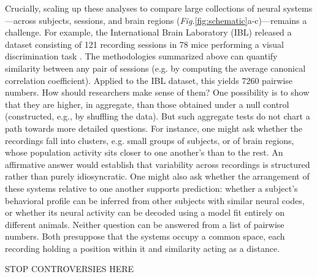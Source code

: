 Crucially, scaling up these analyses to compare large collections of neural systems---across subjects, sessions, and brain regions (\textit{Fig.}\ref{fig:schematic}a-c)---remains a challenge.
For example, the International Brain Laboratory (IBL) released a dataset consisting of 121 recording sessions in 78 mice performing a visual discrimination task \parencite{iblreproducibility}.
The methodologies summarized above can quantify similarity between any pair of sessions (e.g. by computing the average canonical correlation coefficient).
Applied to the IBL dataset, this yields 7260 pairwise numbers.
How should researchers make sense of them?
One possibility is to show that they are higher, in aggregate, than those obtained under a null control (constructed, e.g., by shuffling the data).
But such aggregate tests do not chart a path towards more detailed questions. For instance, one might ask whether the recordings fall into clusters, e.g. small groups of subjects, or of brain regions, whose population activity sits closer to one another's than to the rest. An affirmative answer would establish that variability across recordings is structured rather than purely idiosyncratic. One might also ask whether the arrangement of these systems relative to one another supports prediction: whether a subject's behavioral profile can be inferred from other subjects with similar neural codes, or whether its neural activity can be decoded using a model fit entirely on different animals. Neither question can be answered from a list of pairwise numbers. Both presuppose that the systems occupy a common space, each recording holding a position within it and similarity acting as a distance.

STOP CONTROVERSIES HERE



